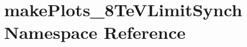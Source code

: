 \hypertarget{namespacemakePlots__8TeVLimitSynch}{
\section{makePlots\_\-8TeVLimitSynch Namespace Reference}
\label{namespacemakePlots__8TeVLimitSynch}
}
